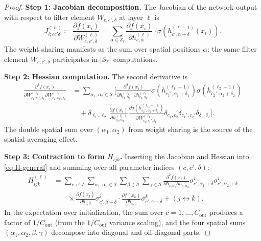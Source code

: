\documentclass[11pt]{article}
\theoremstyle{definition}
\newcommand{\cS}{\mathcal{S}}
\newcommand{\pp}{\partial}
\begin{document}
\begin{proof}
\textbf{Step 1: Jacobian decomposition.} The Jacobian of the network output with respect to filter element $W_{c,c',\delta}$ at layer $\ell$ is
\begin{equation}
J_{i;cc'\delta}^{(\ell)} \coloneqq \frac{\pp f(x_i)}{\pp W_{c,c',\delta}^{(\ell)}} = \sum_{\alpha \in \cS_\ell} \frac{\pp f(x_i)}{\pp h_{c,\alpha}^{(\ell)}} \cdot \sigma(h_{c',\alpha+\delta}^{(\ell-1)}(x_i)).
\end{equation}
The weight sharing manifests as the sum over spatial positions $\alpha$: the same filter element $W_{c,c',\delta}$ participates in $|\cS_\ell|$ computations.

\textbf{Step 2: Hessian computation.} The second derivative is
\begin{align}
\frac{\pp^2 f(x_i)}{\pp W_{c_1,c_1',\delta_1}^{(\ell_1)} \pp W_{c_2,c_2',\delta_2}^{(\ell_2)}}
&= \sum_{\alpha_1, \alpha_2 \in \cS} \Bigg[
\frac{\pp^2 f(x_i)}{\pp h_{c_1,\alpha_1}^{(\ell_1)} \pp h_{c_2,\alpha_2}^{(\ell_2)}} \sigma(h_{c_1',\alpha_1+\delta_1}^{(\ell_1-1)}) \sigma(h_{c_2',\alpha_2+\delta_2}^{(\ell_2-1)}) \nonumber \\
&\quad + \delta_{\ell_1,\ell_2}\, \frac{\pp f(x_i)}{\pp h_{c_1,\alpha_1}^{(\ell_1)}} \frac{\pp \sigma(h_{c_2',\alpha_2+\delta_2}^{(\ell_1-1)})}{\pp W_{c_1,c_1',\delta_1}^{(\ell_1)}} \delta_{c_1,c_2}\delta_{c_1',c_2'}\delta_{\delta_1,\delta_2} \Bigg].
\end{align}
The double spatial sum over $(\alpha_1, \alpha_2)$ from weight sharing is the source of the spatial averaging effect.

\textbf{Step 3: Contraction to form $H_{ijk}$.} Inserting the Jacobian and Hessian into \eqref{eq:H-general} and summing over all parameter indices $(c,c',\delta)$:
\begin{align}
H_{ijk}^{(\ell)} &= \sum_{c,c',\delta} \sum_{\alpha_1,\alpha_2 \in \cS} \sum_{\beta \in \cS} \sum_{\gamma \in \cS}
\frac{\pp^2 f(x_i)}{\pp h_{c,\alpha_1} \pp h_{c,\alpha_2}} \sigma_{c',\alpha_1+\delta}^i \sigma_{c',\alpha_2+\delta}^i \nonumber \\
&\qquad \times \frac{\pp f(x_j)}{\pp h_{c,\beta}} \sigma_{c',\beta+\delta}^j \cdot \frac{\pp f(x_k)}{\pp h_{c,\gamma}} \sigma_{c',\gamma+\delta}^k + (j \leftrightarrow k).
\end{align}
In the expectation over initialization, the sum over $c = 1,\ldots, C_{\mathrm{out}}$ produces a factor of $1/C_{\mathrm{out}}$ (from the $1/C_{\mathrm{out}}$ variance scaling), and the four spatial sums $(\alpha_1, \alpha_2, \beta, \gamma)$ decompose into diagonal and off-diagonal parts.


\end{proof}
\end{document}
